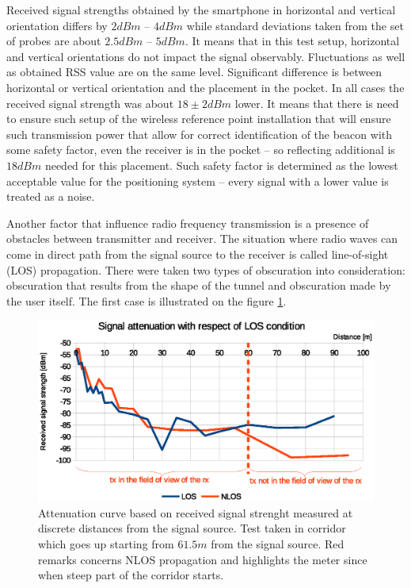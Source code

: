 \documentclass[../main.tex]{subfiles}
\begin{document}
Received signal strengths obtained by the smartphone in horizontal and vertical orientation differs by $2 dBm$ -- $4 dBm$ while standard deviations taken from the set of probes are about $2.5 dBm$ -- $5 dBm$. It means that in this test setup, horizontal and vertical orientations do not impact the signal observably. Fluctuations as well as obtained RSS value are on the same level. Significant difference is between horizontal or vertical orientation and the placement in the pocket. In all cases the received signal strength was about $18\pm2 dBm$ lower. It means that there is need to ensure such setup of the wireless reference point installation that will ensure such transmission power that allow for correct identification of the beacon with some safety factor, even the receiver is in the pocket -- so reflecting additional is $18dBm$ needed for this placement. Such safety factor is determined as the lowest acceptable value for the positioning system -- every signal with a lower value is treated as a noise.

Another factor that influence radio frequency transmission is a presence of obstacles between transmitter and receiver. The situation where radio waves can come in direct path from the signal source to the receiver is called line-of-sight (LOS) propagation. There were taken two types of obscuration into consideration: obscuration that results from the shape of the tunnel and obscuration made by the user itself. The first case is illustrated on the figure \ref{fig:tests_case4_los}.

\begin{figure}[!htbp]
\includegraphics[width=\textwidth, keepaspectratio]{pictures/tests_case4_los}
\centering
\caption{Attenuation curve based on received signal strenght measured at discrete distances from the signal source. Test taken in corridor which goes up starting from $61.5 m$ from the signal source. Red remarks concerns NLOS propagation and highlights the meter since when steep part of the corridor starts.}
\label{fig:tests_case4_los}
\end{figure}
\end{document}
